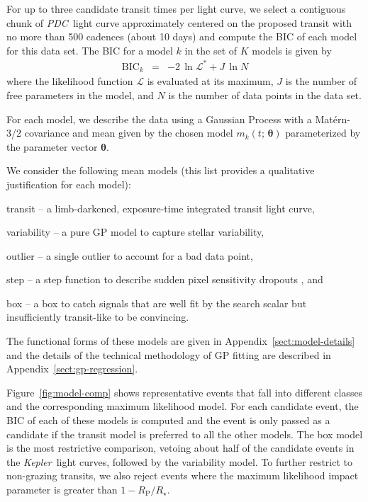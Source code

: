 \documentclass[manuscript, letterpaper]{aastex6}
\newcommand{\project}[1]{\textsl{#1}}
\newcommand{\kepler}{\project{Kepler}}
\newcommand{\pdc}{\project{PDC}}
\newcommand{\dfmfigref}[1]{\ref{fig:#1}}
\newcommand{\dfmFig}[1]{Figure~\dfmfigref{#1}}
\newcommand{\dfmfig}[1]{\dfmFig{#1}}
\newcommand{\sectref}[1]{\ref{sect:#1}}
\newcommand{\App}[1]{Appendix~\sectref{#1}}
\newcommand{\app}[1]{\App{#1}}
\newcommand{\bvec}[1]{{\ensuremath{\boldsymbol{#1}}}}
\newcommand{\meanpars}{{\ensuremath{\bvec{\theta}}}}
\newcommand{\modelname}[1]{{\textsf{#1}}}
\begin{document}
For up to three candidate transit times per light curve, we select a
contiguous chunk of \pdc\ light curve approximately centered on the proposed
transit with no more than 500 cadences (about 10 days) and compute the BIC of
each model for this data set.
The BIC for a model $k$ in the set of $K$ models is given by
\begin{eqnarray}
\mathrm{BIC}_k &=& -2\,\ln \mathcal{L}^* + J\,\ln N
\end{eqnarray}
where the likelihood function $\mathcal{L}$ is evaluated at its maximum, $J$
is the number of free parameters in the model, and $N$ is the number of
data points in the data set.

For each model, we describe the data using a Gaussian Process
\citep[GP;][]{Rasmussen:2006} with a Mat\'ern-3/2 covariance and mean given by
the chosen model $m_k(t;\,\meanpars)$ parameterized by the parameter vector
\meanpars.

We consider the following mean models (this list provides a qualitative
justification for each model):
\begin{itemize}
{\item \modelname{transit} -- a limb-darkened, exposure-time integrated
transit light curve,}
{\item \modelname{variability} -- a pure GP model to capture
stellar variability,}
{\item \modelname{outlier} -- a single outlier to account for a bad data
point,}
{\item \modelname{step} -- a step function to describe sudden pixel
sensitivity dropouts \citep[SPSDs; for example][]{Christiansen:2013}, and}
{\item \modelname{box} -- a box to catch signals that are well fit by the
search scalar but insufficiently transit-like to be convincing.}
\end{itemize}
The functional forms of these models are given in \app{model-details} and the
details of the technical methodology of GP fitting are described in
\app{gp-regression}.

\dfmfig{model-comp} shows representative events that fall into different
classes and the corresponding maximum likelihood model.
For each candidate event, the BIC of each of these models is computed and the
event is only passed as a candidate if the \modelname{transit} model is
preferred to all the other models.
The \modelname{box} model is the most restrictive comparison, vetoing about
half of the candidate events in the \kepler\ light curves, followed by the
\modelname{variability} model.
To further restrict to non-grazing transits, we also reject events where the
maximum likelihood impact parameter is greater than $1 - R_\mathrm{P} /
R_\star$.
\end{document}
